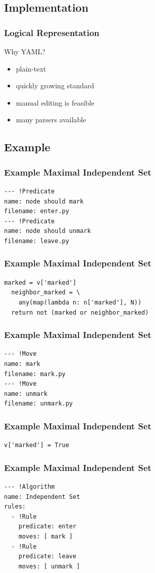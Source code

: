 \documentclass{beamer}
\begin{document}
\subsection{Implementation}
\begin{frame}
  \frametitle{Logical Representation}
  \begin{block}{Why YAML?}
    \begin{itemize}[<+->]
    \item plain-text
    \item quickly growing standard
    \item manual editing is feasible
    \item many parsers available
    \end{itemize}
  \end{block}
\end{frame}

\subsection{Example}
\begin{frame}[fragile]
  \frametitle{Example \Dash Maximal Independent Set}
\begin{lstlisting}[style=myyaml]
--- !Predicate
name: node should mark
filename: enter.py
--- !Predicate
name: node should unmark
filename: leave.py
\end{lstlisting}
\end{frame}
\begin{frame}[fragile]
  \frametitle{Example \Dash Maximal Independent Set}
  \vspace{1ex}
\begin{lstlisting}[style=mypy]
  marked = v['marked']
  neighbor_marked = \
    any(map(lambda n: n['marked'], N))
  return not (marked or neighbor_marked)
\end{lstlisting}
\end{frame}
\begin{frame}[fragile]
  \frametitle{Example \Dash Maximal Independent Set}
\begin{lstlisting}[style=myyaml]
--- !Move
name: mark
filename: mark.py
--- !Move
name: unmark
filename: unmark.py
\end{lstlisting}
\end{frame}
\begin{frame}[fragile]
  \frametitle{Example \Dash Maximal Independent Set}
  \vspace{1ex}
\begin{lstlisting}[style=mypy]
  v['marked'] = True
\end{lstlisting}
\end{frame}
\begin{frame}[fragile]
  \frametitle{Example \Dash Maximal Independent Set}
\begin{lstlisting}[style=myyaml]
--- !Algorithm
name: Independent Set
rules:
  - !Rule
    predicate: enter
    moves: [ mark ]
  - !Rule
    predicate: leave
    moves: [ unmark ]
\end{lstlisting}
\end{frame}
\end{document}
